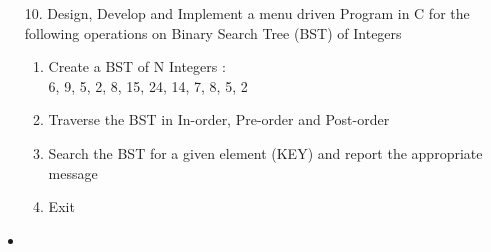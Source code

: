 \documentclass{article}
\newcommand{\answer}{\item [$\rightarrow$]}
\begin{document}
	\begin{itemize}
		\item [10. ] Design, Develop and Implement a menu driven Program in C for the following operations on Binary Search Tree (BST) of Integers

		\begin{enumerate}[label=\alph*.]
		\item Create a BST of N Integers : \\ 6, 9, 5, 2, 8, 15, 24, 14, 7, 8, 5, 2
		\item Traverse the BST in In-order, Pre-order and Post-order
		\item Search the BST for a given element (KEY) and report the appropriate message
		\item Exit
		\end{enumerate}

		\answer \inputminted{c}{../Program10.c}
	\end{itemize}
\end{document}

